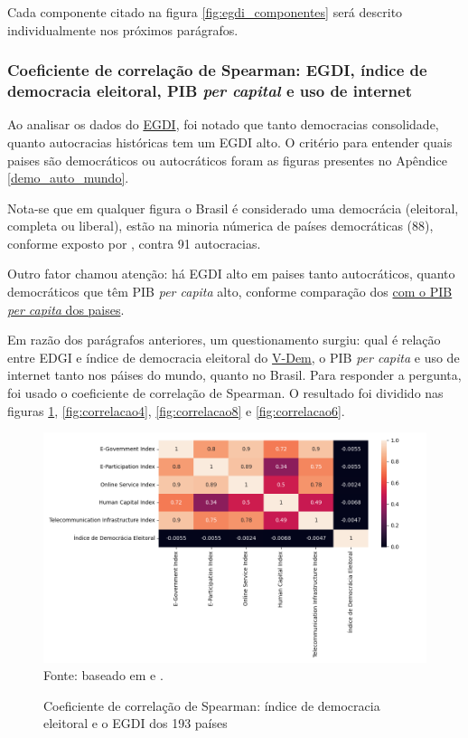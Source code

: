 Cada componente citado na figura \ref{fig:egdi_componentes} será descrito individualmente nos próximos parágrafos.



\subsubsection{Coeficiente de correlação de Spearman: EGDI, índice de democracia eleitoral, PIB \textit{per capital} e uso de internet}

Ao analisar os dados do \href{https://publicadministration.un.org/egovkb/en-us/About/Overview/-E-Government-Development-Index}{EGDI}, foi notado que tanto democracias consolidade, quanto autocracias históricas tem um EGDI alto. O critério para entender quais paises são democráticos ou autocráticos foram as figuras presentes no Apêndice \ref{demo_auto_mundo}. 

Nota-se que em qualquer figura o Brasil é considerado uma democrácia (eleitoral, completa ou liberal), estão na minoria númerica de países democráticas (88), conforme exposto por \cite{nord2025democracy}, contra 91 autocracias.

Outro fator chamou atenção: há EGDI alto em paises tanto autocráticos, quanto democráticos que têm PIB \textit{per capita} alto, conforme comparação dos \href{https://data.worldbank.org/indicator/NY.GDP.PCAP.PP.KD}{com o PIB \textit{per capita} dos paises}. 

Em razão dos parágrafos anteriores, um questionamento surgiu: qual é relação entre EDGI e índice de democracia eleitoral do \href{https://www.v-dem.net/}{V-Dem}, o PIB \textit{per capita} e uso de internet tanto nos páises do mundo, quanto no Brasil. Para responder a pergunta, foi usado o coeficiente de correlação de Spearman. O resultado foi dividido nas figuras \ref{fig:correlacao3}, \ref{fig:correlacao4}, \ref{fig:correlacao8} e \ref{fig:correlacao6}.

\begin{figure}[H]
    \centering
    \caption{Coeficiente de correlação de Spearman: índice de democracia eleitoral e o EGDI dos 193 países}
    \includegraphics[width=1\linewidth]{figuras/egdi/correlacao3.png}
    \label{fig:correlacao3}
    \footnotesize{Fonte: baseado em \cite{ONU_edgi_mapa} e \cite{electoral_democracy_index}.}
\end{figure}

